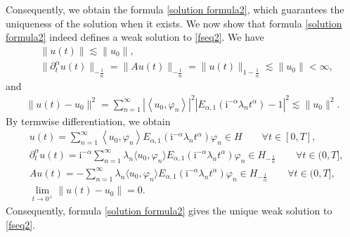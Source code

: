 \documentclass[reqno]{amsart}
\makeatletter
\renewenvironment{proof}[1][\proofname]{\par
  \pushQED{\qed}%
  \normalfont \topsep6\p@\@plus6\p@\relax
  \trivlist
  \item[\hskip\labelsep\bfseries #1\@addpunct{.}]%
}{%
  \popQED\endtrivlist\@endpefalse
}
\numberwithin{equation}{section}
\makeatother
\begin{document}
\begin{proof}
	Consequently, we obtain the formula \eqref{solution formula2}, which guarantees the uniqueness of the solution when it exists. We now show that formula \eqref{solution formula2} indeed defines a weak solution to \eqref{fseq2}. We have
	\begin{align}
		&\|u(t)\|\lesssim \|u_0\|, \nonumber\\
		&\|\partial_{t}^{\alpha}u(t)\|_{-\frac{1}{\alpha}}=\|Au(t)\|_{-\frac{1}{\alpha}}=\|u(t)\|_{1-\frac{1}{\alpha}}\lesssim\|u_0\|<\infty \nonumber,
	\end{align} 
	and 
	\begin{align}
		\|u(t)-u_0\|^2=\sum_{n=1}^{\infty}|\left\langle u_0, \varphi_n\right\rangle|^2 |E_{\alpha, 1}\left(\mathrm{i}^{-\alpha}\lambda_n t^\alpha\right)-1|^2\lesssim \|u_0\|^2. \nonumber
	\end{align}
	By termwise differentiation, we obtain
	\begin{align*}
		& u(t)=\sum_{n=1}^{\infty}\left\langle u_0, \varphi_n\right\rangle E_{\alpha, 1}\left(\mathrm{i}^{-\alpha}\lambda_n t^\alpha\right) \varphi_n\in H \qquad \forall t\in [0,T],\\
		&\partial_t^\alpha u(t)=\mathrm{i}^{-\alpha}\sum_{n=1}^{\infty}\lambda_{n}\langle u_0,\varphi_{n}\rangle E_{\alpha,1}(\mathrm{i}^{-\alpha}\lambda_{n}t^{\alpha})\varphi_n\in H_{-\frac{1}{\alpha}}\qquad \forall t\in (0,T], \\
		&Au(t)=-\sum_{n=1}^{\infty}\lambda_{n}\langle u_0,\varphi_{n}\rangle E_{\alpha,1}(\mathrm{i}^{-\alpha}\lambda_{n}t^{\alpha})\varphi_n\in H_{-\frac{1}{\alpha}}\qquad \forall t\in (0,T],\\
		&\lim_{t\to 0^{+}}\|u(t)-u_0\|=0.
	\end{align*}
	Consequently, formula \eqref{solution formula2} gives the unique weak solution to \eqref{fseq2}.
\end{proof}
\end{document}
